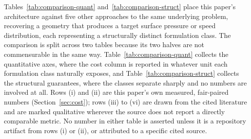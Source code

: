 Tables~\ref{tab:comparison-quant} and~\ref{tab:comparison-struct} place this
paper's architecture against five other approaches to the same underlying
problem, recovering a geometry that produces a target surface pressure or
speed distribution, each representing a structurally distinct formulation
class. The comparison is split across two tables because its two halves are
not commensurable in the same way. Table~\ref{tab:comparison-quant} collects
the quantitative axes, where the cost column is reported in whatever unit each
formulation class naturally exposes, and Table~\ref{tab:comparison-struct}
collects the structural guarantees, where the classes separate sharply and no
numbers are involved at all. Rows (i) and (ii) are this paper's own measured,
fair-paired numbers (Section~\ref{sec:cost}); rows (iii) to (vi) are drawn
from the cited literature and are marked qualitative wherever the source does
not report a directly comparable metric. No number in either table is asserted
unless it is a repository artifact from rows (i) or (ii), or attributed to a
specific cited source.


